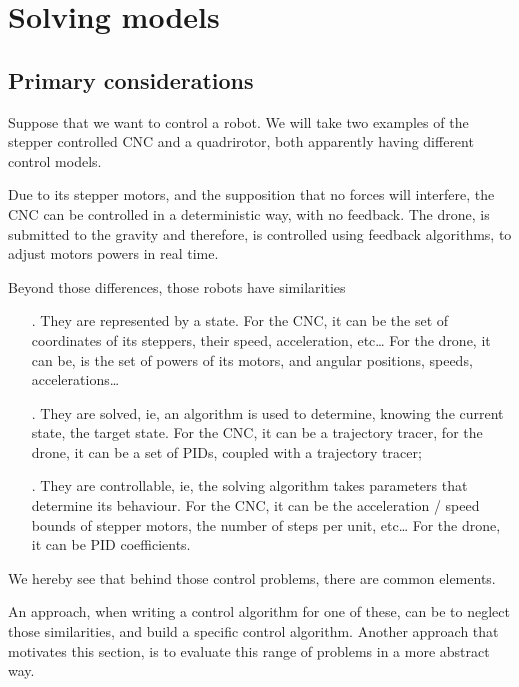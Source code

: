 \section{Solving models}

\subsection{Primary considerations}

Suppose that we want to control a robot.
We will take two examples of the stepper controlled CNC and a quadrirotor, both apparently having different control models.\newline

Due to its stepper motors, and the supposition that no forces will interfere, the CNC can be controlled in a deterministic way, with no feedback.
The drone, is submitted to the gravity and therefore, is controlled using feedback algorithms, to adjust motors powers in real time.\newline

Beyond those differences, those robots have similarities
\begin{itemize}
    \item [.] They are represented by a state.
    For the CNC, it can be the set of coordinates of its steppers, their speed, acceleration, etc\ldots
    For the drone, it can be, is the set of powers of its motors, and angular positions, speeds, accelerations\ldots
    \item[.] They are solved, ie, an algorithm is used to determine, knowing the current state, the target state.
    For the CNC, it can be a trajectory tracer, for the drone, it can be a set of PIDs, coupled with a trajectory tracer;
    \item[.] They are controllable, ie, the solving algorithm takes parameters that determine its behaviour.
    For the CNC, it can be the acceleration / speed bounds of stepper motors, the number of steps per unit, etc\ldots
    For the drone, it can be PID coefficients.\newline
\end{itemize}

We hereby see that behind those control problems, there are common elements.\newline

An approach, when writing a control algorithm for one of these, can be to neglect those similarities, and build a specific control algorithm.
Another approach that motivates this section, is to evaluate this range of problems in a more abstract way.\newline

